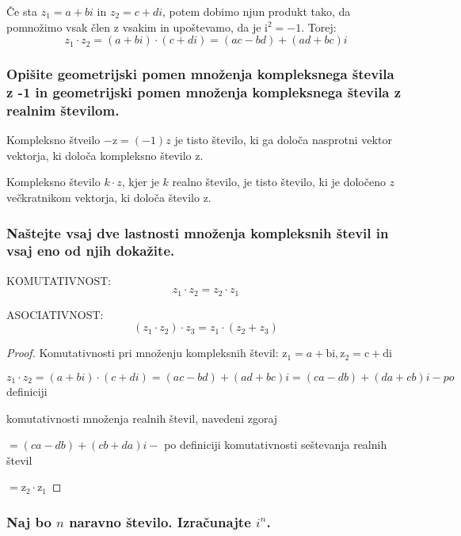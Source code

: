 \documentclass{article}
\begin{document}
Če sta $z_{1}=a+b i$ in $z_{2}=c+d i$, potem dobimo njun produkt tako, da pomnožimo vsak člen z vsakim in upoštevamo, da je $\mathrm{i}^{2}=-1$. Torej:
\begin{equation*}
    z_{1} \cdot z_{2}=(a+b i) \cdot(c+d i)=(a c-b d)+(a d+b c) i
\end{equation*}

\subsubsection*{Opišite geometrijski pomen množenja kompleksnega števila z -1 in geometrijski pomen množenja kompleksnega števila z realnim številom.}

Kompleksno štveilo $-\mathrm{z}=(-1) z$ je tisto število, ki ga določa nasprotni vektor vektorja, ki določa kompleksno število z.

Kompleksno število $k \cdot z$, kjer je $k$ realno število, je tisto število, ki je določeno $z$ večkratnikom vektorja, ki določa število z.

\subsubsection*{Naštejte vsaj dve lastnosti množenja kompleksnih števil in vsaj eno od njih dokažite.}

KOMUTATIVNOST:
\begin{equation*}
z_{1} \cdot z_{2}=z_{2} \cdot z_{1}
\end{equation*}

ASOCIATIVNOST:
\begin{equation*}
\left(z_{1} \cdot z_{2}\right) \cdot z_{3}=z_{1} \cdot\left(z_{2}+z_{3}\right)
\end{equation*}

\begin{proof}
    Komutativnosti pri množenju kompleksnih števil:
    $\mathrm{z}_{1}=a+\mathrm{bi}, \mathrm{z}_{2}=\mathrm{c}+\mathrm{di}$

$z_{1} \cdot z_{2}=(a+b i) \cdot(c+d i)=(a c-b d)+(a d+b c) i=(c a-d b)+(d a+c b) i-p o$ definiciji

komutativnosti množenja realnih števil, navedeni zgoraj

$=(c a-d b)+(c b+d a) i-$ po definiciji komutativnosti seštevanja realnih števil

$=\mathrm{z}_{2} \cdot \mathrm{z}_{1}$
\end{proof}
\subsubsection*{Naj bo $n$ naravno število. Izračunajte $i^{n}$.}
\end{document}
